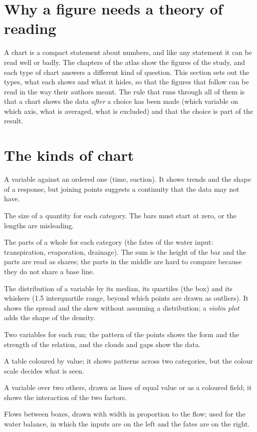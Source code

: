 \section{Why a figure needs a theory of reading}
A chart is a compact statement about numbers, and like any statement it can be read well or badly. The chapters of the atlas show the figures of the study, and each type of chart answers a different kind of question. This section sets out the types, what each shows and what it hides, so that the figures that follow can be read in the way their authors meant. The rule that runs through all of them is that a chart shows the data \emph{after} a choice has been made (which variable on which axis, what is averaged, what is excluded) and that the choice is part of the result.

\section{The kinds of chart}
\begin{exlist}
\item {} A variable against an ordered one (time, suction). It shows trends and the shape of a response, but joining points suggests a continuity that the data may not have.
\item {} The size of a quantity for each category. The bars must start at zero, or the lengths are misleading.
\item {} The parts of a whole for each category (the fates of the water input: transpiration, evaporation, drainage). The sum is the height of the bar and the parts are read as shares; the parts in the middle are hard to compare because they do not share a base line.
\item {} The distribution of a variable by its median, its quartiles (the box) and its whiskers (1.5 interquartile range, beyond which points are drawn as outliers). It shows the spread and the skew without assuming a distribution; a \emph{violin plot} adds the shape of the density.
\item {} Two variables for each run; the pattern of the points shows the form and the strength of the relation, and the clouds and gaps show the data.
\item {} A table coloured by value; it shows patterns across two categories, but the colour scale decides what is seen.
\item {} A variable over two others, drawn as lines of equal value or as a coloured field; it shows the interaction of the two factors.
\item {} Flows between boxes, drawn with width in proportion to the flow; used for the water balance, in which the inputs are on the left and the fates are on the right.
\end{exlist}

